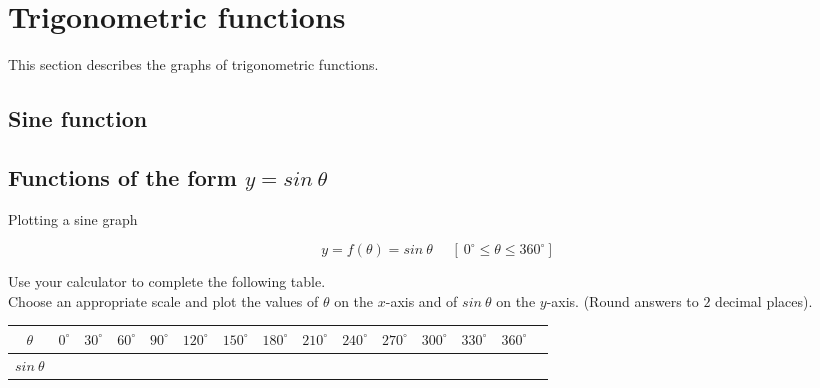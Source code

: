 \section{Trigonometric functions}
This section describes the graphs of trigonometric functions.\par 
{}
\pagebreak %
\subsection{Sine function}
\subsection*{Functions of the form $y=sin~\theta$}
\begin{wex}
{Plotting a sine graph}
{
\begin{equation*}
  y = f(\theta) = sin~\theta~~~~~~[~0^{\circ} \leq \theta \leq 360^{\circ}]
\end{equation*}


Use your calculator to complete the following table. \\
Choose an appropriate scale and plot the values of $\theta $ on the $x$-axis and of $sin~\theta $ on the $y$-axis. (Round answers to $2$ decimal places). 


\begin{table}[H]


\begin{tabular}{|c|m{0.3cm}|m{0.4cm}|m{0.4cm}|m{0.4cm}|m{0.5cm}|m{0.5cm}|m{0.5cm}|m{0.5cm}|m{0.5cm}|m{0.5cm}|m{0.5cm}|m{0.5cm}|m{0.5cm}|} \hline

\footnotesize$\theta $&
\footnotesize$0^{\circ }$&
\footnotesize$30^{\circ }$&
\footnotesize$60^{\circ }$&
\footnotesize$90^{\circ }$&
\footnotesize$120^{\circ }$&
\footnotesize$150^{\circ }$&
\footnotesize$180^{\circ }$&
\footnotesize$210^{\circ }$&
\footnotesize$240^{\circ }$&
\footnotesize$270^{\circ }$&
\footnotesize$300^{\circ }$&
\footnotesize$330^{\circ }$&
\footnotesize$360^{\circ }$
\\ \hline

\footnotesize$sin~\theta$&
&
&
&
&
&
&
&
&
&
&
&
&
&

 \hline
\end{tabular}


\end{table}}
\end{wex}
